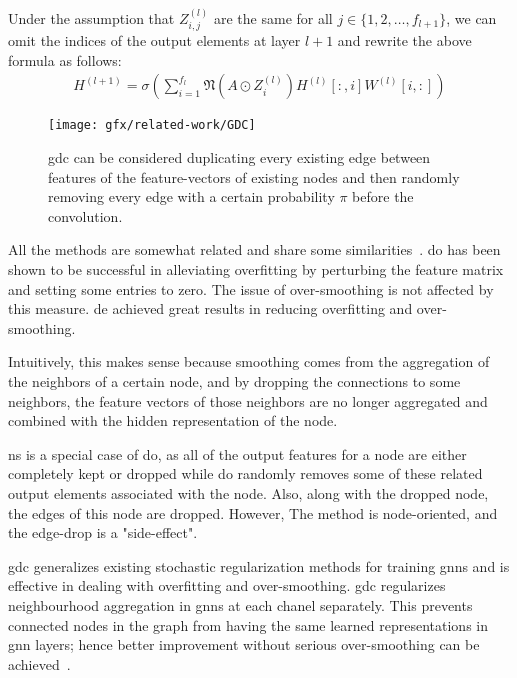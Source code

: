 Under the assumption that $Z_{i,j}^{(l)}$ are the same for all $j \in \{1,2,\dots, f_{l+1}\}$, we can omit the indices of the output elements at layer $l+1$ and rewrite the above formula as follows:
\begin{align*}
    H^{(l+1)} = \sigma(\sum_{i= 1}^{f_{l}}\mathfrak{N}(A \odot Z_{i}^{(l)})H^{(l)}[:,i] W^{(l)}[i,:])
\end{align*}
\begin{figure}[H]
    \centering
    \texttt{[image: gfx/related-work/GDC]}
    \caption{\acf{gdc} can be considered duplicating every existing edge between features of the feature-vectors of existing nodes and then randomly removing every edge with a certain probability $\pi$ before the convolution.}\label{fig:related:GraphDropConnect}
\end{figure}

All the methods are somewhat related and share some similarities~\cite{Rong2020}.
\Acf{do} has been shown to be successful in alleviating overfitting by perturbing the feature matrix and setting some entries to zero.
The issue of over-smoothing is not affected by this measure.
\Acf{de} achieved great results in reducing overfitting and over-smoothing.

Intuitively, this makes sense because smoothing comes from the aggregation of the neighbors of a certain node, and by dropping the connections to some neighbors, the feature vectors of those neighbors are no longer aggregated and combined with the hidden representation of the node.

\Acf{ns} is a special case of \acf{do}, as all of the output features for a node are either completely kept or dropped while \ac{do} randomly removes some of these related output elements associated with the node.
Also, along with the dropped node, the edges of this node are dropped.
However, The method is node-oriented, and the edge-drop is a "side-effect".

\Acf{gdc} generalizes existing stochastic regularization methods for training \acp{gnn} and is effective in dealing with overfitting and over-smoothing.
\Ac{gdc} regularizes neighbourhood aggregation in \acp{gnn} at each chanel separately.
This prevents connected nodes in the graph from having the same learned representations in \ac{gnn} layers;
hence better improvement without serious over-smoothing can be achieved~\cite{Hasanzadeh2020}.

